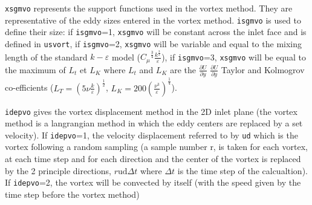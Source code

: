 {{{\begin{list}{-}{}
\begin{list}{*}{}
\item \texttt{xsgmvo} represents the support functions used in the vortex
  method. They are representative of the eddy sizes entered in the vortex
  method.
  \texttt{isgmvo} is used to define their size: if \texttt{isgmvo}=1,
  \texttt{xsgmvo} will be constant across the inlet face and is defined in
  \texttt{usvort}, if \texttt{isgmvo}=2, \texttt{xsgmvo} will be variable and
  equal to the mixing length of the standard $k-\varepsilon$ model
  ($\displaystyle {C_\mu}^{\frac{3}{4}} \displaystyle \frac{k^{\frac{3}{2}}}{\varepsilon}$), if
  \texttt{isgmvo}=3, \texttt{xsgmvo} will be equal to the maximum of $L_t$ et
  $L_K$ where $L_t$ and $L_K$ are the $\displaystyle \frac{\partial U}{\partial y}$
  $\displaystyle \frac{\partial U}{\partial y}$
  Taylor and Kolmogrov co-efficients
  ($\displaystyle L_T=(5 \nu \frac{k}{\displaystyle \varepsilon})^{\frac{1}{2}}$,
  $\displaystyle L_K= 200 (\frac{\nu^3}{\varepsilon})^{\frac{1}{4}}$).

\item \texttt{idepvo} gives the vortex displacement method in the 2D inlet plane
  (the vortex method is a langrangian method in which the eddy centers are
  replaced by a set velocity). If \texttt{idepvo}=1, the velocity displacement
  referred to by \texttt{ud} which is the vortex following a random sampling
  (a sample number r, is taken for each vortex, at each time step and for each direction and
  the center of the vortex is replaced by the 2 principle directions,
  $r \mbox{ud} \Delta t$ where $\Delta t$ is the time step of the calcualtion).
  If \texttt{idepvo}=2, the vortex will be convected by itself (with the speed
  given by the time step before the vortex method)
\end{list}


\end{list}}}}
